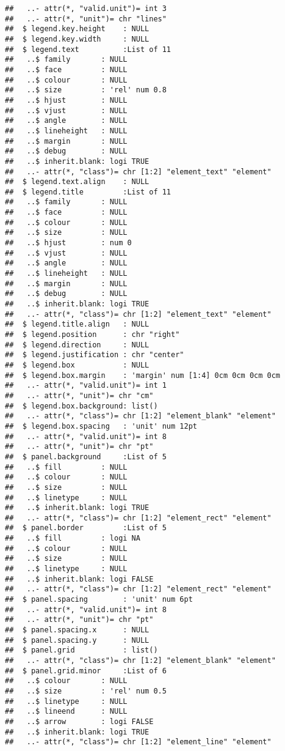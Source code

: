 \documentclass[]{article}
\begin{document}
\begin{verbatim}
##   ..- attr(*, "valid.unit")= int 3
##   ..- attr(*, "unit")= chr "lines"
##  $ legend.key.height    : NULL
##  $ legend.key.width     : NULL
##  $ legend.text          :List of 11
##   ..$ family       : NULL
##   ..$ face         : NULL
##   ..$ colour       : NULL
##   ..$ size         : 'rel' num 0.8
##   ..$ hjust        : NULL
##   ..$ vjust        : NULL
##   ..$ angle        : NULL
##   ..$ lineheight   : NULL
##   ..$ margin       : NULL
##   ..$ debug        : NULL
##   ..$ inherit.blank: logi TRUE
##   ..- attr(*, "class")= chr [1:2] "element_text" "element"
##  $ legend.text.align    : NULL
##  $ legend.title         :List of 11
##   ..$ family       : NULL
##   ..$ face         : NULL
##   ..$ colour       : NULL
##   ..$ size         : NULL
##   ..$ hjust        : num 0
##   ..$ vjust        : NULL
##   ..$ angle        : NULL
##   ..$ lineheight   : NULL
##   ..$ margin       : NULL
##   ..$ debug        : NULL
##   ..$ inherit.blank: logi TRUE
##   ..- attr(*, "class")= chr [1:2] "element_text" "element"
##  $ legend.title.align   : NULL
##  $ legend.position      : chr "right"
##  $ legend.direction     : NULL
##  $ legend.justification : chr "center"
##  $ legend.box           : NULL
##  $ legend.box.margin    : 'margin' num [1:4] 0cm 0cm 0cm 0cm
##   ..- attr(*, "valid.unit")= int 1
##   ..- attr(*, "unit")= chr "cm"
##  $ legend.box.background: list()
##   ..- attr(*, "class")= chr [1:2] "element_blank" "element"
##  $ legend.box.spacing   : 'unit' num 12pt
##   ..- attr(*, "valid.unit")= int 8
##   ..- attr(*, "unit")= chr "pt"
##  $ panel.background     :List of 5
##   ..$ fill         : NULL
##   ..$ colour       : NULL
##   ..$ size         : NULL
##   ..$ linetype     : NULL
##   ..$ inherit.blank: logi TRUE
##   ..- attr(*, "class")= chr [1:2] "element_rect" "element"
##  $ panel.border         :List of 5
##   ..$ fill         : logi NA
##   ..$ colour       : NULL
##   ..$ size         : NULL
##   ..$ linetype     : NULL
##   ..$ inherit.blank: logi FALSE
##   ..- attr(*, "class")= chr [1:2] "element_rect" "element"
##  $ panel.spacing        : 'unit' num 6pt
##   ..- attr(*, "valid.unit")= int 8
##   ..- attr(*, "unit")= chr "pt"
##  $ panel.spacing.x      : NULL
##  $ panel.spacing.y      : NULL
##  $ panel.grid           : list()
##   ..- attr(*, "class")= chr [1:2] "element_blank" "element"
##  $ panel.grid.minor     :List of 6
##   ..$ colour       : NULL
##   ..$ size         : 'rel' num 0.5
##   ..$ linetype     : NULL
##   ..$ lineend      : NULL
##   ..$ arrow        : logi FALSE
##   ..$ inherit.blank: logi TRUE
##   ..- attr(*, "class")= chr [1:2] "element_line" "element"

\end{verbatim}
\end{document}
